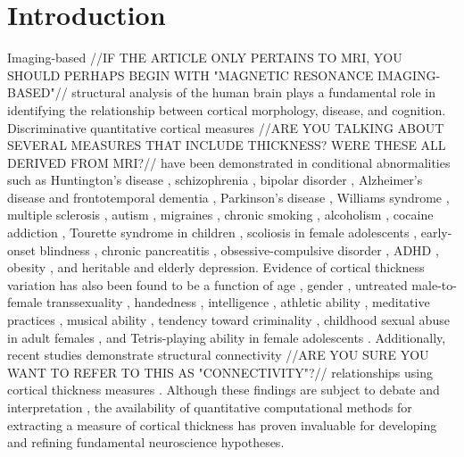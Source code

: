 \section{Introduction}

Imaging-based //IF THE ARTICLE ONLY PERTAINS TO MRI, YOU SHOULD PERHAPS BEGIN WITH "MAGNETIC RESONANCE IMAGING-BASED"//
structural analysis of the human brain plays a fundamental role
in identifying the relationship between cortical morphology, disease, and cognition.
Discriminative quantitative cortical measures //ARE YOU TALKING ABOUT SEVERAL MEASURES THAT INCLUDE THICKNESS?  WERE THESE ALL DERIVED FROM MRI?//
have been demonstrated in conditional abnormalities such as
Huntington's disease \citep{rosas2002,rosas2005,selemon2004}, 
schizophrenia \citep{nesvag2008}, bipolar disorder \cite{lyoo2006}, Alzheimer's disease and frontotemporal
dementia \citep{du2007,dickerson2009}, Parkinson's disease \citep{jubault2011}, Williams syndrome \citep{thompson2005},
multiple sclerosis \citep{ramasamy2009}, autism \citep{chung2005,hardan2006},
migraines \citep{dasilva2007}, chronic smoking \citep{kuhn2010}, alcoholism \citep{fortier2011},
cocaine addiction \citep{makris2008}, Tourette syndrome in children \citep{sowell2008},
scoliosis in
female adolescents \citep{wang2012}, 
early-onset blindness \citep{jiang2009},
chronic pancreatitis \citep{frokjaer2012},
obsessive-compulsive disorder \citep{shin2007}, ADHD \citep{almeida-montes2012}, obesity \citep{raji2010}, 
and heritable \citep{peterson2009}
and elderly \citep{ballmaier2004} depression.  Evidence of cortical thickness 
variation has also been found to be a function of age \citep{kochunov2011},
gender \citep{luders2006a}, untreated
male-to-female transsexuality \citep{luders2012},  handedness
\citep{luders2006,amunts2007}, intelligence \citep{shaw2006}, athletic
ability \citep{wei2011}, meditative practices \cite{lazar2005}, musical ability \citep{bermudez2009,foster2010}, 
tendency toward criminality \citep{raine2011}, 
childhood sexual abuse in adult females \citep{heim2013},
and Tetris-playing
ability in female adolescents \citep{haier2009}.  Additionally,
recent studies demonstrate structural 
connectivity //ARE YOU SURE YOU WANT TO REFER TO THIS AS "CONNECTIVITY"?// relationships using cortical thickness measures
\citep{worsley2005,lerch2006,he2007,chen2008}.
Although these findings
are subject to debate and interpretation \citep{gernsbacher2007}, 
the availability of quantitative
computational methods for extracting a measure of cortical thickness
has proven invaluable for developing and refining fundamental 
neuroscience hypotheses.

